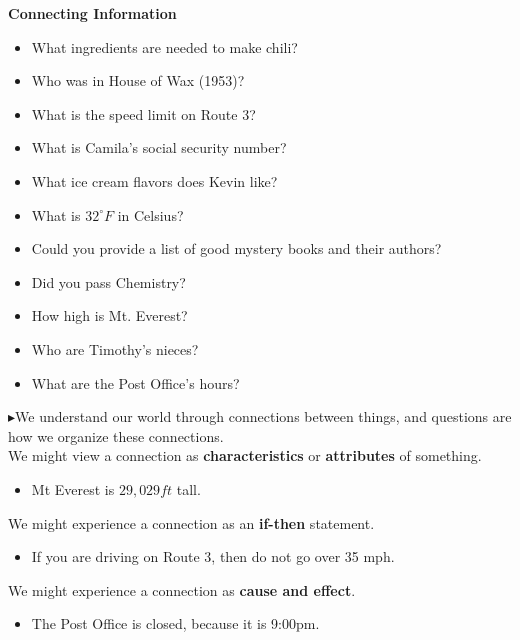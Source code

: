 \documentclass{ximera}
\begin{document}
\begin{observation} \textbf{\textcolor{blue!75!black}{Connecting Information}}  

\begin{itemize} 
\item What ingredients are needed to make chili?
\item Who was in House of Wax (1953)?
\item What is the speed limit on Route 3?
\item What is Camila's social security number?
\item What ice cream flavors does Kevin like?
\item What is $32^\circ F$ in Celsius?
\item Could you provide a list of good mystery books and their authors?
\item Did you pass Chemistry?
\item How high is Mt. Everest?
\item Who are Timothy's nieces?
\item What are the Post Office's hours?
\end{itemize}

$\blacktriangleright$We understand our world through connections between things, and questions are how we organize these connections. \\


We might view a connection as \textbf{\textcolor{purple!85!blue}{characteristics}} or \textbf{\textcolor{purple!85!blue}{attributes}} of something. 
\begin{itemize}
\item Mt Everest is $29,029 ft$ tall.
\end{itemize}


We might experience a connection as an \textbf{\textcolor{purple!85!blue}{if-then}} statement.
\begin{itemize}
\item If you are driving on Route 3, then do not go over 35 mph.
\end{itemize}



We might experience a connection as \textbf{\textcolor{purple!85!blue}{cause and effect}}.
\begin{itemize}
\item The Post Office is closed, because it is 9:00pm.
\end{itemize}

\end{observation}
\end{document}
